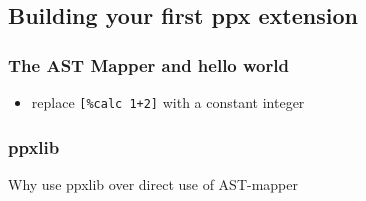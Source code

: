 \hypertarget{building-your-first-ppx-extension}{%
\subsection{Building your first ppx
extension}\label{building-your-first-ppx-extension}}

\hypertarget{the-ast-mapper-and-hello-world}{%
\subsubsection{The AST Mapper and hello
world}\label{the-ast-mapper-and-hello-world}}

\begin{itemize}
\tightlist
\item
  replace \passthrough{\lstinline![\%calc 1+2]!} with a constant integer
\end{itemize}

\hypertarget{ppxlib}{%
\subsubsection{ppxlib}\label{ppxlib}}

Why use ppxlib over direct use of AST-mapper
